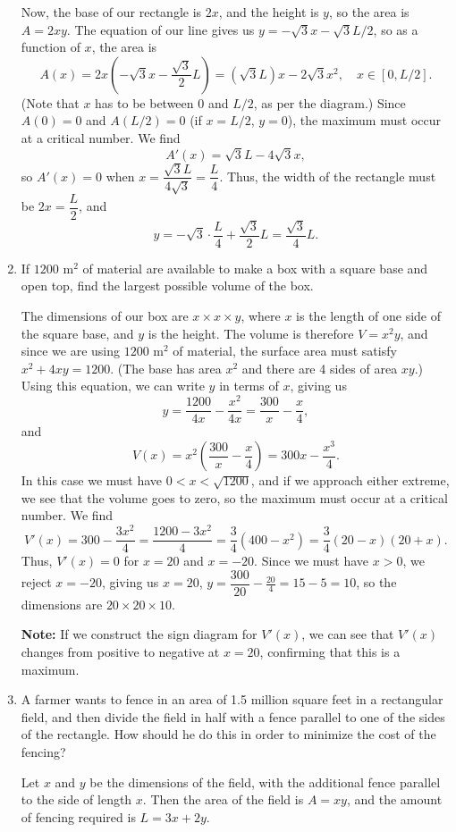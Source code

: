 \documentclass[12pt]{article}
\begin{document}
\begin{enumerate}
Now, the base of our rectangle is $2x$, and the height is $y$, so the area is $A=2xy$. The equation of our line gives us $y=-\sqrt{3}x-\sqrt{3}L/2$, so as a function of $x$, the area is
\[
A(x) = 2x\left(-\sqrt{3}x-\frac{\sqrt{3}}{2}L\right)=(\sqrt{3}L)x-2\sqrt{3}x^2, \quad x\in [0,L/2].
\]
(Note that $x$ has to be between $0$ and $L/2$, as per the diagram.) Since $A(0)=0$ and $A(L/2)=0$ (if $x=L/2$, $y=0$), the maximum must occur at a critical number. We find
\[
A'(x) = \sqrt{3}L-4\sqrt{3}x,
\]
so $A'(x)=0$ when $x = \dfrac{\sqrt{3}L}{4\sqrt{3}}=\dfrac{L}{4}$. Thus, the width of the rectangle must be $2x=\dfrac{L}{2}$, and 
\[
y = -\sqrt{3}\cdot\frac{L}{4}+\frac{\sqrt{3}}{2}L = \frac{\sqrt{3}}{4}L.
\]

\item If $1200 \text{ m}^2$ of material are available to make a box with a square base and open top, find the largest possible volume of the box.

The dimensions of our box are $x\times x\times y$, where $x$ is the length of one side of the square base, and $y$ is the height. The volume is therefore $V=x^2y$, and since we are using $1200 \text{ m}^2$ of material, the surface area must satisfy
$x^2+4xy = 1200.$
(The base has area $x^2$ and there are 4 sides of area $xy$.) Using this equation, we can write $y$ in terms of $x$, giving us 
\[
y=\frac{1200}{4x}-\frac{x^2}{4x} = \frac{300}{x}-\frac{x}{4},
\]
and 
\[
V(x) = x^2\left(\frac{300}{x}-\frac{x}{4}\right) = 300x-\frac{x^3}{4}.
\]
In this case we must have $0<x<\sqrt{1200}$, and if we approach either extreme, we see that the volume goes to zero, so the maximum must occur at a critical number. We find
\[
V'(x) = 300-\frac{3x^2}{4} = \frac{1200-3x^2}{4} =\frac{3}{4}(400-x^2)=\frac{3}{4}(20-x)(20+x).
\]
Thus, $V'(x)=0$ for $x=20$ and $x=-20$. Since we must have $x>0$, we reject $x=-20$, giving us $x=20$, $y=\dfrac{300}{20}-\frac{20}{4}=15-5=10$, so the dimensions are $20\times 20\times 10$.

\textbf{Note:} If we construct the sign diagram for $V'(x)$, we can see that $V'(x)$ changes from positive to negative at $x=20$, confirming that this is a maximum.

\item A farmer wants to fence in an area of 1.5 million square feet in a rectangular field, and then divide the field in half with a fence parallel to one of the sides of the rectangle. How should he do this in order to minimize the cost of the fencing?

Let $x$ and $y$ be the dimensions of the field, with the additional fence parallel to the side of length $x$. Then the area of the field is $A=xy$, and the amount of fencing required is $L=3x+2y$.


\end{enumerate}
\end{document}
